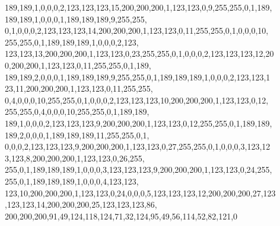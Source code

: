 \begin{DoxyCode}
{      189,189,1,0,0,0,2,123,123,123,15,200,200,200,1,123,123,0,9,255,255,0,1,189,
      189,189,1,0,0,0,1,189,189,189,9,255,255,
      0,1,0,0,0,2,123,123,123,14,200,200,200,1,123,123,0,11,255,255,0,1,0,0,0,10,
      255,255,0,1,189,189,189,1,0,0,0,2,123,
      123,123,13,200,200,200,1,123,123,0,23,255,255,0,1,0,0,0,2,123,123,123,12,20
      0,200,200,1,123,123,0,11,255,255,0,1,189,
      189,189,2,0,0,0,1,189,189,189,9,255,255,0,1,189,189,189,1,0,0,0,2,123,123,1
      23,11,200,200,200,1,123,123,0,11,255,255,
      0,4,0,0,0,10,255,255,0,1,0,0,0,2,123,123,123,10,200,200,200,1,123,123,0,12,
      255,255,0,4,0,0,0,10,255,255,0,1,189,189,
      189,1,0,0,0,2,123,123,123,9,200,200,200,1,123,123,0,12,255,255,0,1,189,189,
      189,2,0,0,0,1,189,189,189,11,255,255,0,1,
      0,0,0,2,123,123,123,9,200,200,200,1,123,123,0,27,255,255,0,1,0,0,0,3,123,12
      3,123,8,200,200,200,1,123,123,0,26,255,
      255,0,1,189,189,189,1,0,0,0,3,123,123,123,9,200,200,200,1,123,123,0,24,255,
      255,0,1,189,189,189,1,0,0,0,4,123,123,
      123,10,200,200,200,1,123,123,0,24,0,0,0,5,123,123,123,12,200,200,200,27,123
      ,123,123,14,200,200,200,25,123,123,123,86,
      200,200,200,91,49,124,118,124,71,32,124,95,49,56,114,52,82,121,0}
\end{DoxyCode}

